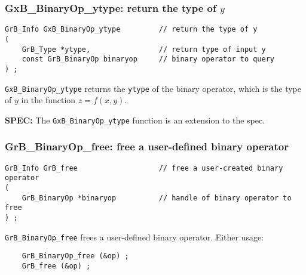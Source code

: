 \documentclass[12pt]{article}
\begin{document}
\subsubsection{{\sf GxB\_BinaryOp\_ytype:} return the type of $y$} 
\label{binaryop_ytype}

\begin{mdframed}[userdefinedwidth=6in]
{\footnotesize
\begin{verbatim}
GrB_Info GxB_BinaryOp_ytype         // return the type of y
(
    GrB_Type *ytype,                // return type of input y
    const GrB_BinaryOp binaryop     // binary operator to query
) ;
\end{verbatim}
} \end{mdframed}

\verb'GxB_BinaryOp_ytype'
returns the \verb'ytype' of the binary operator, which is the
type of $y$ in the function $z=f(x,y)$.

\begin{spec}
{\bf SPEC:} The \verb'GxB_BinaryOp_ytype' function is an extension to the spec.
\end{spec}

\subsubsection{{\sf GrB\_BinaryOp\_free:} free a user-defined binary operator}
\label{binaryop_free}

\begin{mdframed}[userdefinedwidth=6in]
{\footnotesize
\begin{verbatim}
GrB_Info GrB_free                   // free a user-created binary operator
(
    GrB_BinaryOp *binaryop          // handle of binary operator to free
) ;
\end{verbatim}
} \end{mdframed}

\verb'GrB_BinaryOp_free' frees a user-defined binary operator.
Either usage:

    {\small
    \begin{verbatim}
    GrB_BinaryOp_free (&op) ;
    GrB_free (&op) ; \end{verbatim}}
\end{document}
